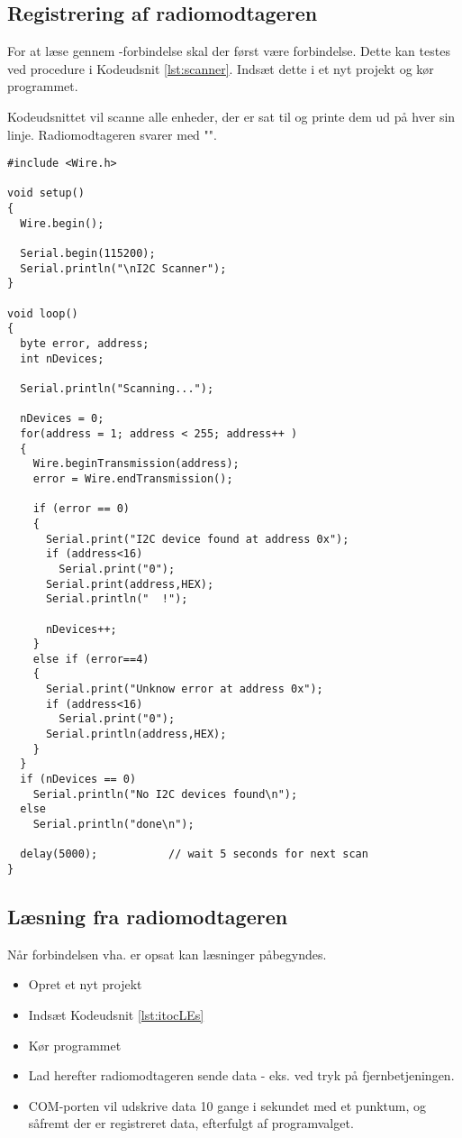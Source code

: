 \documentclass[Main]{subfiles}
\begin{document}
\subsection{Registrering af radiomodtageren}
For at læse gennem \itoc-forbindelse skal der først være forbindelse.
Dette kan testes ved procedure i Kodeudsnit \ref{lst:scanner}.
Indsæt dette i et nyt projekt og kør programmet.

Kodeudsnittet vil scanne alle enheder, der er sat til \itoc og printe dem ud på hver sin linje.
Radiomodtageren svarer med "".

\begin{lstlisting}[caption=Scan efter \itoc enheder, style=Code-C, label=lst:scanner]
#include <Wire.h>

void setup()
{
  Wire.begin();

  Serial.begin(115200);
  Serial.println("\nI2C Scanner");
}

void loop()
{
  byte error, address;
  int nDevices;

  Serial.println("Scanning...");

  nDevices = 0;
  for(address = 1; address < 255; address++ ) 
  {
    Wire.beginTransmission(address);
    error = Wire.endTransmission();

    if (error == 0)
    {
      Serial.print("I2C device found at address 0x");
      if (address<16) 
        Serial.print("0");
      Serial.print(address,HEX);
      Serial.println("  !");

      nDevices++;
    }
    else if (error==4) 
    {
      Serial.print("Unknow error at address 0x");
      if (address<16) 
        Serial.print("0");
      Serial.println(address,HEX);
    }    
  }
  if (nDevices == 0)
    Serial.println("No I2C devices found\n");
  else
    Serial.println("done\n");

  delay(5000);           // wait 5 seconds for next scan
}
\end{lstlisting}


\newpage
\subsection{Læsning fra radiomodtageren}
Når forbindelsen vha. \itoc er opsat kan læsninger påbegyndes.
\begin{itemize}
\item Opret et nyt projekt
\item Indsæt Kodeudsnit \ref{lst:itocLEs}
\item Kør programmet
\item Lad herefter radiomodtageren sende data - eks. ved tryk på fjernbetjeningen.
\item COM-porten vil udskrive data 10 gange i sekundet med et punktum, og såfremt der er registreret data, efterfulgt af programvalget.
\end{itemize}
\end{document}

